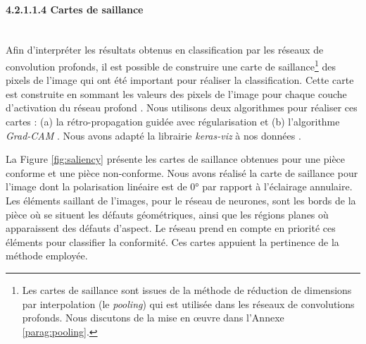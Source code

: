 \paragraph{4.2.1.1.4 Cartes de saillance} \mbox{} \\
Afin d’interpréter les résultats obtenus en classification par les réseaux de convolution profonds, il est possible de construire une carte de saillance\footnote{Les cartes de saillance sont issues de la méthode de réduction de dimensions par interpolation (le \textit{pooling}) qui est utilisée dans les réseaux de convolutions profonds. Nous discutons de la mise en œuvre dans l'Annexe \ref{parag:pooling}.} des pixels de l'image qui ont été important pour réaliser la classification.
Cette carte est construite en sommant les valeurs des pixels de l’image pour chaque couche d’activation du réseau profond \cite{simonyan_deep_2013, li_visual_2015}.
Nous utilisons deux algorithmes pour réaliser ces cartes : (a) la rétro-propagation guidée \cite{springenberg_striving_2014} avec régularisation \cite{smilkov_smoothgrad_2017} et (b) l’algorithme \textit{Grad-CAM} \cite{selvaraju_grad-cam_2016}.
Nous avons adapté la librairie \textit{keras-viz} à nos données \cite{raghakotkerasvis}.

La Figure \ref{fig:saliency} présente les cartes de saillance obtenues pour une pièce conforme et une pièce non-conforme.
Nous avons réalisé la carte de saillance pour l'image dont la polarisation linéaire est de 0° par rapport à l'éclairage annulaire.
Les éléments saillant de l’images, pour le réseau de neurones, sont les bords de la pièce où se situent les défauts géométriques, ainsi que les régions planes où apparaissent des défauts d’aspect.
Le réseau prend en compte en priorité ces éléments pour classifier la conformité.
Ces cartes appuient la pertinence de la méthode employée.

